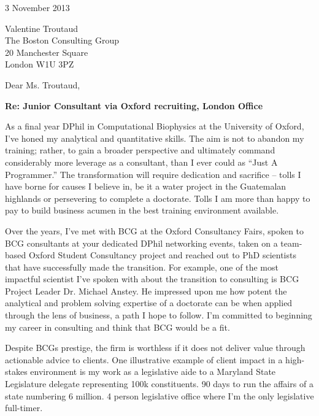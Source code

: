 \documentclass[a4paper]{../res}
\begin{document}
 
\begin{sloppypar}
 
%


\begin{resume} 
 
3 November 2013

Valentine Troutaud \\
The Boston Consulting Group \\
20 Manchester Square \\
London W1U 3PZ

Dear Ms. Troutaud, %

\textbf{Re: Junior Consultant via Oxford recruiting, London Office}

As a final year DPhil in Computational Biophysics at the University of Oxford, I've honed my analytical and quantitative skills. The aim is not to abandon my training; rather, to gain a broader perspective and ultimately command considerably more leverage as a consultant, than I ever could as ``Just A Programmer.'' The transformation will require dedication and sacrifice -- tolls I have borne for causes I believe in, be it a water project in the Guatemalan highlands or persevering to complete a doctorate. Tolls I am more than happy to pay to build business acumen in the best training environment available.

Over the years, I've met with BCG at the Oxford Consultancy Fairs, spoken to BCG consultants at your dedicated DPhil networking events, taken on a team-based Oxford Student Consultancy project and reached out to PhD scientists that have successfully made the transition. For example, one of the most impactful scientist I've spoken with about the transition to consulting is BCG Project Leader Dr. Michael Anstey. He impressed upon me how potent the analytical and problem solving expertise of a doctorate can be when applied through the lens of business, a path I hope to follow. I'm committed to beginning my career in consulting and think that BCG would be a fit.

Despite BCGs prestige, the firm is worthless if it does not deliver value through actionable advice to clients. One illustrative example of client impact in a high-stakes environment is my work as a legislative aide to a Maryland State Legislature delegate representing 100k constituents. 90 days to run the affairs of a state numbering 6 million. 4 person legislative office where I'm the only legislative full-timer.


\end{resume}
\end{sloppypar}
\end{document}
